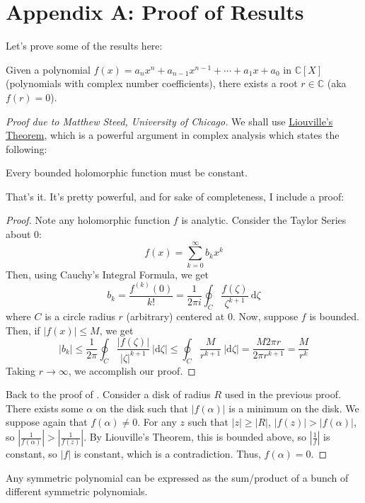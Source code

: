 \documentclass[11pt,titlepage]{scrartcl}
\begin{document}
\section{Appendix A: Proof of Results}\label{appa}
Let's prove some of the results here:
\begin{theorem}
Given a polynomial $f(x) = a_nx^n +a_{n-1}x^{n-1}+\cdots+a_1x+a_0$ in $\mathbb C[X]$ (polynomials with complex number coefficients), there exists a root $r\in\mathbb C$ (aka $f(r)=0$).
\end{theorem}
\begin{proof}[Proof due to Matthew Steed, University of Chicago]
We shall use \href{https://en.wikipedia.org/wiki/Liouville%27s_theorem_(complex_analysis)}{Liouville's Theorem}, which is a powerful argument in complex analysis which states the following:
\begin{theorem}
Every bounded holomorphic function must be constant.
\end{theorem}
That's it. It's pretty powerful, and for sake of completeness, I include a proof:
\begin{proof}
Note any holomorphic function $f$ is analytic. Consider the Taylor Series about 0:
\[f(x)=\sum_{k=0}^{\infty}b_kx^k\]
Then, using Cauchy's Integral Formula, we get
\[b_k=\dfrac{f^{(k)}(0)}{k!}=\dfrac{1}{2\pi i}\oint_{C}\dfrac{f(\zeta)}{\zeta^{k+1}}~\text{d}\zeta\]
where $C$ is a circle radius $r$ (arbitrary) centered at $0$. Now, suppose $f$ is bounded. Then, if $|f(x)|\leq M$, we get
\[|b_k|\leq \dfrac{1}{2\pi}\oint_{C}\dfrac{|f(\zeta)|}{|\zeta|^{k+1}}~|\text{d}\zeta|\leq\oint_{C}\dfrac{M}{r^{k+1}}~|\text{d}\zeta|=\dfrac{M2\pi r}{2\pi r^{k+1}}=\dfrac{M}{r^k}\]
Taking $r\to\infty$, we accomplish our proof.
\end{proof}
Back to the proof of . Consider a disk of radius $R$ used
in the previous proof. There exists some $\alpha$ on the disk such that $|f(\alpha)|$ is a minimum on the disk. We suppose again that $f(\alpha)\neq 0$. For any $z$ such that $|z|\geq|R|$, $|f(z)|>|f(\alpha)|$, so $\left|\tfrac{1}{f(\alpha)}\right|>\left| \tfrac{1}{f(z)} \right|$. By Liouville's Theorem, this is bounded above, so $\left|\tfrac 1f\right|$ is constant, so $|f|$ is constant, which is a contradiction. Thus, $f(\alpha)=0$.
\end{proof}
\begin{theorem}
Any symmetric polynomial can be expressed as the sum/product of a bunch of different symmetric polynomials.
\end{theorem}
\end{document}
